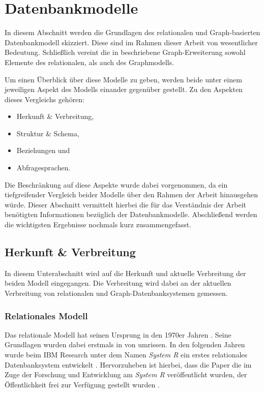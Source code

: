 \section{Datenbankmodelle}
In diesem Abschnitt werden die Grundlagen des relationalen und Graph-basierten Datenbankmodell skizziert. Diese sind im Rahmen dieser Arbeit von wesentlicher Bedeutung. Schließlich vereint die in  beschriebene Graph-Erweiterung sowohl Elemente des relationalen, als auch des Graphmodells.

Um einen Überblick über diese Modelle zu geben, werden beide unter einem jeweiligen Aspekt des Modells einander gegenüber gestellt. Zu den Aspekten dieses Vergleichs gehören: 

\begin{itemize}
    \item Herkunft \& Verbreitung,
    \item Struktur \& Schema,
    \item Beziehungen und
    \item Abfragesprachen.
\end{itemize}

Die Beschränkung auf diese Aspekte wurde dabei vorgenommen, da ein tiefgreifender Vergleich beider Modelle über den Rahmen der Arbeit hinausgehen würde. Dieser Abschnitt vermittelt hierbei die für das Verständnis der Arbeit benötigten Informationen bezüglich der Datenbankmodelle. Abschließend werden die wichtigsten Ergebnisse nochmals kurz zusammengefasst.  

\subsection{Herkunft \& Verbreitung}
In diesem Unterabschnitt wird auf die Herkunft und aktuelle Verbreitung der beiden Modell eingegangen. Die Verbreitung wird dabei an der aktuellen Verbreitung von relationalen und Graph-Datenbanksystemen gemessen. 

\subsubsection{Relationales Modell}
Das relationale Modell hat seinen Ursprung in den 1970er Jahren \cite{rdbms_history}. Seine Grundlagen wurden dabei erstmals in \cite{codd_relational_model} von \citeauthor{codd_relational_model} umrissen. In den folgenden Jahren  wurde beim IBM Research unter dem Namen \textit{System R} ein erstes relationales Datenbanksystem entwickelt \cite{rdbms_history}. Hervorzuheben ist hierbei, dass die Paper die im Zuge der Forschung und Entwicklung am \textit{System R} veröffentlicht wurden, der Öffentlichkeit frei zur Verfügung gestellt wurden \cite{rdbms_history}. 


